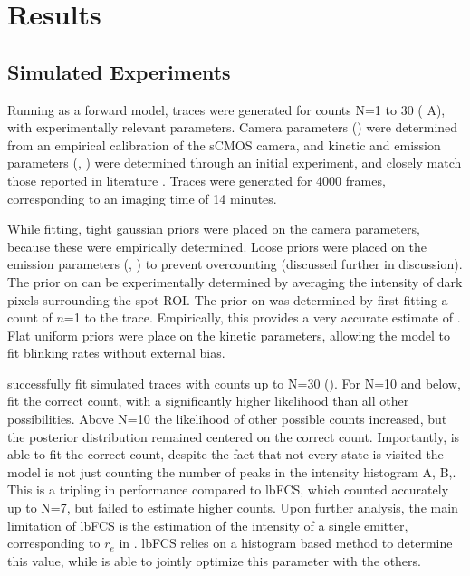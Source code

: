 \section{Results}






\subsection{Simulated Experiments}
Running \ours as a forward model, traces were generated for counts N=1 to 30
	( A), with experimentally relevant parameters. 
	Camera parameters (\parametersc) were determined from an empirical calibration of the
	sCMOS camera, and kinetic and emission parameters (\parameterst, \parameterse) were determined through an
	initial experiment, and closely match those reported in literature \cite{stein_2021}.
	Traces were generated for 4000 frames, corresponding to an imaging time of 14 minutes.

While fitting, tight gaussian priors were placed on the camera parameters, because these were empirically determined.
	Loose priors were placed on the emission parameters (\rb, \re) to prevent overcounting (discussed further in discussion). 
	The prior on \rb can be experimentally determined by averaging the intensity of dark pixels surrounding the spot ROI.
	The prior on \re was determined by first fitting a count of $n$=1 to the trace. 
	Empirically, this provides a very accurate estimate of \re.
	Flat uniform priors were place on the kinetic parameters, allowing the model to fit blinking rates without external bias.

\ours successfully fit simulated traces with counts up to N=30 ().
	For N=10 and below, \ours fit the correct count, with a significantly higher likelihood than all other possibilities. 
	Above N=10 the likelihood of other possible counts increased, but the posterior distribution remained centered on the correct count.
	Importantly, \ours is able to fit the correct count,
	despite the fact that not every state is visited \ie the model is not just counting the number of peaks in the intensity histogram  A, B,.
	This is a tripling in performance compared to lbFCS, which counted accurately up to N=7, but failed to estimate higher counts.
	Upon further analysis, the main limitation of lbFCS is the estimation of the intensity of a single emitter, corresponding to $r_e$ in \ours. 
	lbFCS relies on a histogram based method to determine this value, while \ours is able to jointly optimize this parameter with the others.


